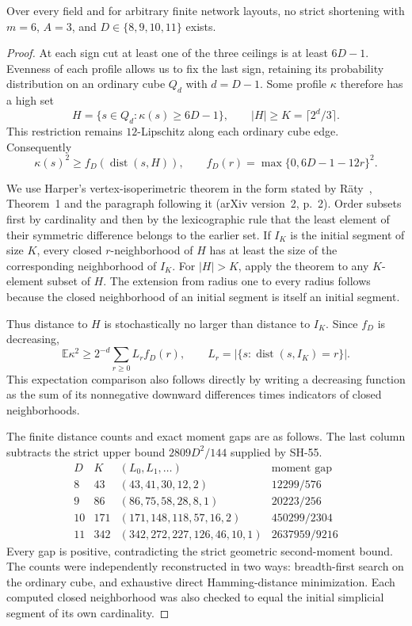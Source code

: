 \begin{theorem}
\label{thm:width-six-three-term-harper}
Over every field and for arbitrary finite network layouts,
no strict shortening with $m=6$, $A=3$, and
$D\in\{8,9,10,11\}$ exists.
\end{theorem}
\begin{proof}
At each sign cut at least one of the three ceilings is
at least $6D-1$.  Evenness of each profile allows us
to fix the last sign, retaining its probability
distribution on an ordinary cube $Q_d$ with $d=D-1$.
Some profile $\kappa$ therefore has a high set
\[
 H=\{s\in Q_d:\kappa(s)\geq6D-1\},
 \qquad |H|\geq K=\lceil2^d/3\rceil.
\]
This restriction remains $12$-Lipschitz along each
ordinary cube edge.  Consequently
\[
 \kappa(s)^2\geq f_D(\operatorname{dist}(s,H)),
 \qquad f_D(r)=\max\{0,6D-1-12r\}^2.
 \tag{SH-59.1}
\]

We use Harper's vertex-isoperimetric theorem in the
form stated by R\"aty~\cite{Raty2020}, Theorem~1 and
the paragraph following it (arXiv version~2, p.~2).
Order subsets first by cardinality and then by the
lexicographic rule that the least element of their
symmetric difference belongs to the earlier set.
If $I_K$ is the initial segment of size $K$, every
closed $r$-neighborhood of $H$ has at least the size
of the corresponding neighborhood of $I_K$.
For $|H|>K$, apply the theorem to any $K$-element
subset of $H$.  The extension from radius one to
every radius follows because the closed neighborhood
of an initial segment is itself an initial segment.

Thus distance to $H$ is stochastically no larger than
distance to $I_K$.  Since $f_D$ is decreasing,
\[
 \mathbb E\kappa^2\geq
 2^{-d}\sum_{r\geq0}L_r f_D(r),
 \qquad
 L_r=|\{s:\operatorname{dist}(s,I_K)=r\}|.
 \tag{SH-59.2}
\]
This expectation comparison also follows directly by
writing a decreasing function as the sum of its
nonnegative downward differences times indicators
of closed neighborhoods.

The finite distance counts and exact moment gaps are
as follows.  The last column subtracts the strict
upper bound $2809D^2/144$ supplied by SH-55.
\[
\begin{array}{c|r|l|r}
 D&K&(L_0,L_1,\ldots)&\text{moment gap}\\\hline
 8&43&(43,41,30,12,2)&12299/576\\
 9&86&(86,75,58,28,8,1)&20223/256\\
 10&171&(171,148,118,57,16,2)&450299/2304\\
 11&342&(342,272,227,126,46,10,1)&2637959/9216
\end{array}
\]
Every gap is positive, contradicting the strict
geometric second-moment bound.  The counts were
independently reconstructed in two ways: breadth-first
search on the ordinary cube, and exhaustive direct
Hamming-distance minimization.  Each computed closed
neighborhood was also checked to equal the initial
simplicial segment of its own cardinality.
\end{proof}

